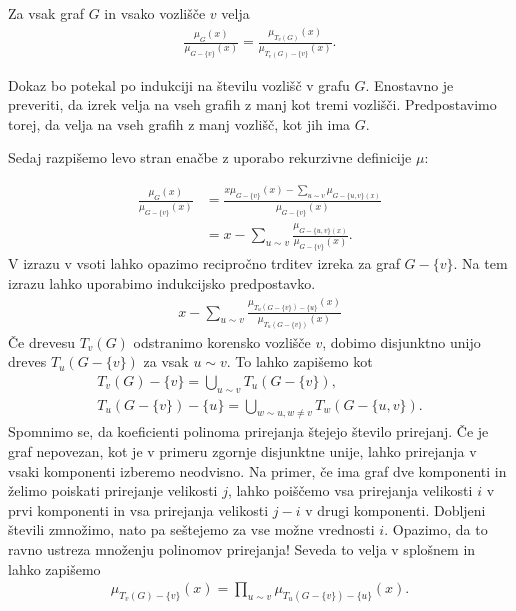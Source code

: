 \begin{lema}\label{lemarekurzpathdrevesa}
    Za vsak graf \(G\) in vsako vozlišče \(v\) velja
    \begin{align*}
        \frac{\mu_G(x)}{\mu_{G-\{v\}}(x)} = \frac{\mu_{T_v(G)}(x)}{\mu_{T_v(G)-\{v\}}(x)}.
    \end{align*}
\end{lema}
\begin{dokaz}
    Dokaz bo potekal po indukciji na številu vozlišč v grafu \(G\). Enostavno je preveriti, da izrek velja na vseh grafih z manj kot tremi vozlišči. Predpostavimo torej, da velja na vseh grafih z manj vozlišč, kot jih ima \(G\).

    Sedaj razpišemo levo stran enačbe z uporabo rekurzivne definicije \(\mu\):

    \begin{align*}
        \frac{\mu_G(x)}{\mu_{G-\{v\}}(x)} & = \frac{x \mu_{G-\{v\}}(x) - \sum_{u\sim v}\mu_{G-\{u, v\}(x)}}{\mu_{G-\{v\}}(x)} \\
                                          & = x - \sum_{u\sim v}\frac{\mu_{G-\{u, v\}(x)}}{\mu_{G-\{v\}}(x)}.
    \end{align*}
    V izrazu v vsoti lahko opazimo recipročno trditev izreka za graf \(G-\{v\}\). Na tem izrazu lahko uporabimo indukcijsko predpostavko.
    \begin{align}\label{lemamatching}
        x - \sum_{u\sim v}\frac{\mu_{T_u(G-\{v\}) - \{u\}}(x)}{\mu_{T_u(G-\{v\})}(x)}
    \end{align}
    Če drevesu \(T_v(G)\) odstranimo korensko vozlišče \(v\), dobimo disjunktno unijo dreves \(T_u(G-\{v\})\) za vsak \(u\sim v\). To lahko zapišemo kot
    \begin{align*}
        T_v(G) - \{v\} = \bigcup_{u\sim v} T_u(G-\{v\}), \\
        T_u(G - \{v\}) - \{u\} = \bigcup_{w\sim u, w\neq v} T_w(G-\{u, v\}).
    \end{align*}
    Spomnimo se, da koeficienti polinoma prirejanja štejejo število prirejanj. Če je graf nepovezan, kot je v primeru zgornje disjunktne unije, lahko prirejanja v vsaki komponenti izberemo neodvisno. Na primer, če ima graf dve komponenti in želimo poiskati prirejanje velikosti \(j\), lahko poiščemo vsa prirejanja velikosti \(i\) v prvi komponenti in vsa prirejanja velikosti \(j-i\) v drugi komponenti. Dobljeni števili zmnožimo, nato pa seštejemo za vse možne vrednosti \(i\). Opazimo, da to ravno ustreza množenju polinomov prirejanja! Seveda to velja v splošnem in lahko zapišemo
    \begin{align*}
        \mu_{T_v(G) - \{v\}}(x) = \prod_{u\sim v} \mu_{T_u(G-\{v\}) - \{u\}}(x).
    \end{align*}


\end{dokaz}
